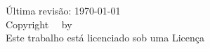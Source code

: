 \null\vfill
\noindent
\begin{center}
\small
    Última revisão: \today
    \\[1em]
    Copyright \textcopyright\ \the\year\ by \shortname%
    \\
    Este trabalho está licenciado sob uma Licença
    \\
    \href{\legalcode}{\license}
\end{center}